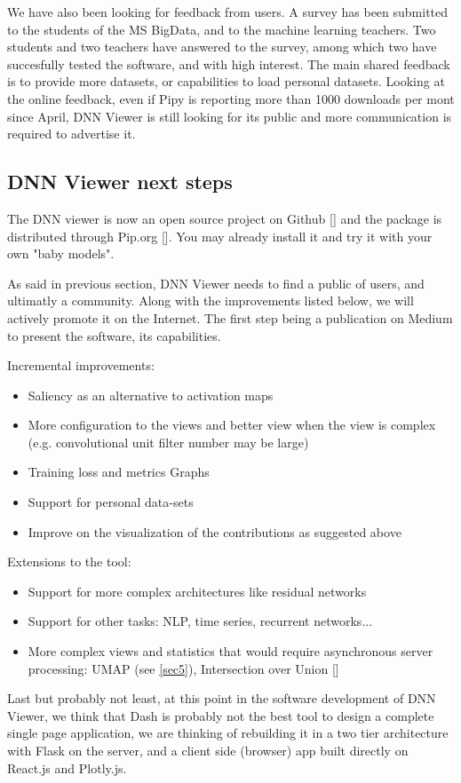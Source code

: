 We have also been looking for feedback from users. A survey has been submitted to the students of the MS BigData, and to the machine learning teachers. Two students and two teachers have answered to the survey, among which two have succesfully tested the software, and with high interest. The main shared feedback is to provide more datasets, or capabilities to load personal datasets. Looking at the online feedback, even if Pipy is reporting more than 1000 downloads per mont since April, DNN Viewer is still looking for its public and more communication is required to advertise it.



\subsection{DNN Viewer next steps}

The DNN viewer is now an open source project on Github [\cite{dnnviewer2020}] and the package is distributed through Pip.org [\cite{dnnviewer-pypi2020}]. You may already install it and try it with your own "baby models".

As said in previous section, DNN Viewer needs to find a public of users, and ultimatly a community. Along with the improvements listed below, we will actively promote it on the Internet. The first step being a publication on Medium to present the software, its capabilities.

Incremental improvements:
\begin{itemize}
    \item Saliency as an alternative to activation maps
    \item More configuration to the views and better view when the view is complex (e.g. convolutional unit filter number may be large)
    \item Training loss and metrics Graphs
    \item Support for personal data-sets
    \item Improve on the visualization of the contributions as suggested above
\end{itemize}

Extensions to the tool:
\begin{itemize}
    \item Support for more complex architectures like residual networks
    \item Support for other tasks: NLP, time series, recurrent networks...
    \item More complex views and statistics that would require asynchronous server processing: UMAP (see \ref{sec5}), Intersection over Union [\cite{Zhou2017}]
\end{itemize}

Last but probably not least, at this point in the software development of DNN Viewer, we think that Dash is probably not the best tool to design a complete single page application, we are thinking of rebuilding it in a two tier architecture with Flask on the server, and a client side (browser) app built directly on React.js and Plotly.js.